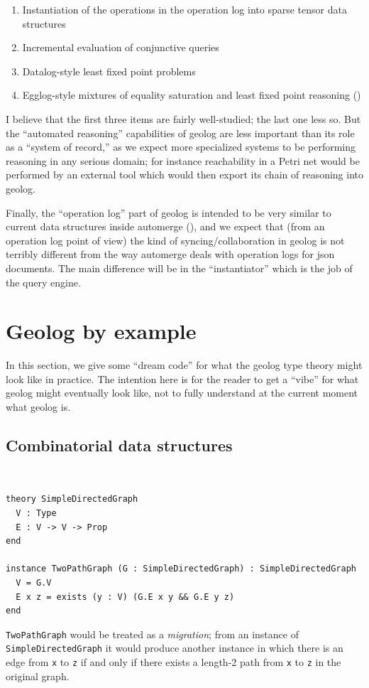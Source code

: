 \documentclass{article}
\begin{document}
\begin{enumerate}
  \item Instantiation of the operations in the operation log into sparse tensor data structures
  \item Incremental evaluation of conjunctive queries
  \item Datalog-style least fixed point problems
  \item Egglog-style mixtures of equality saturation and least fixed point reasoning (\cite{zhang-2023-better})
\end{enumerate}
I believe that the first three items are fairly well-studied; the last one less so. But the ``automated reasoning'' capabilities of geolog are less important than its role as a ``system of record,'' as we expect more specialized systems to be performing reasoning in any serious domain; for instance reachability in a Petri net would be performed by an external tool which would then export its chain of reasoning into geolog.

Finally, the ``operation log'' part of geolog is intended to be very similar to current data structures inside automerge (\cite{automergecontributors-2025-automerge}), and we expect that (from an operation log point of view) the kind of syncing/collaboration in geolog is not terribly different from the way automerge deals with operation logs for json documents. The main difference will be in the ``instantiator'' which is the job of the query engine.

\section{Geolog by example}

In this section, we give some ``dream code'' for what the geolog type theory might look like in practice. The intention here is for the reader to get a ``vibe'' for what geolog might eventually look like, not to fully understand at the current moment what geolog is.

\subsection{Combinatorial data structures}
\begin{example}[Graphs] \,

\begin{verbatim}
theory SimpleDirectedGraph
  V : Type
  E : V -> V -> Prop
end

instance TwoPathGraph (G : SimpleDirectedGraph) : SimpleDirectedGraph
  V = G.V
  E x z = exists (y : V) (G.E x y && G.E y z)
end
\end{verbatim}
\texttt{TwoPathGraph} would be treated as a \emph{migration}; from an instance of \texttt{SimpleDirectedGraph} it would produce another instance in which there is an edge from \texttt{x} to \texttt{z} if and only if there exists a length-2 path from \texttt{x} to \texttt{z} in the original graph.
\end{example}
\end{document}
